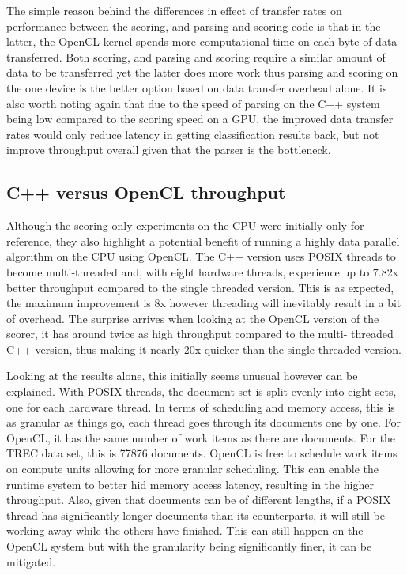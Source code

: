 The simple reason behind the differences in effect of transfer rates on
performance between the scoring, and parsing and scoring code is that in the
latter, the OpenCL kernel spends more computational time on each byte of data
transferred. Both scoring, and parsing and scoring require a similar amount of
data to be transferred yet the latter does more work thus parsing and scoring on
the one device is the better option based on data transfer overhead alone. It is
also worth noting again that due to the speed of parsing on the C++ system being
low compared to the scoring speed on a GPU, the improved data transfer rates
would only reduce latency in getting classification results back, but not
improve throughput overall given that the parser is the bottleneck.

\subsection{C++ versus OpenCL throughput}

Although the scoring only experiments on the CPU were initially only for
reference, they also highlight a potential benefit of running a highly data
parallel algorithm on the CPU using OpenCL. The C++ version uses POSIX threads
to become multi-threaded and, with eight hardware threads, experience up to
7.82x better throughput compared to the single threaded version. This is as
expected, the maximum improvement is 8x however threading will inevitably result
in a bit of overhead. The surprise arrives when looking at the OpenCL version of
the scorer, it has around twice as high throughput compared to the multi-
threaded C++ version, thus making it nearly 20x quicker than the single threaded
version.

Looking at the results alone, this initially seems unusual however can be
explained. With POSIX threads, the document set is split evenly into eight sets,
one for each hardware thread. In terms of scheduling and memory access, this is
as granular as things go, each thread goes through its documents one by one. For
OpenCL, it has the same number of work items as there are documents. For the
TREC data set, this is 77876 documents. OpenCL is free to schedule work items on
compute units allowing for more granular scheduling. This can enable the runtime
system to better hid memory access latency, resulting in the higher throughput.
Also, given that documents can be of different lengths, if a POSIX thread has
significantly longer documents than its counterparts, it will still be working
away while the others have finished. This can still happen on the OpenCL system
but with the granularity being significantly finer, it can be mitigated.

